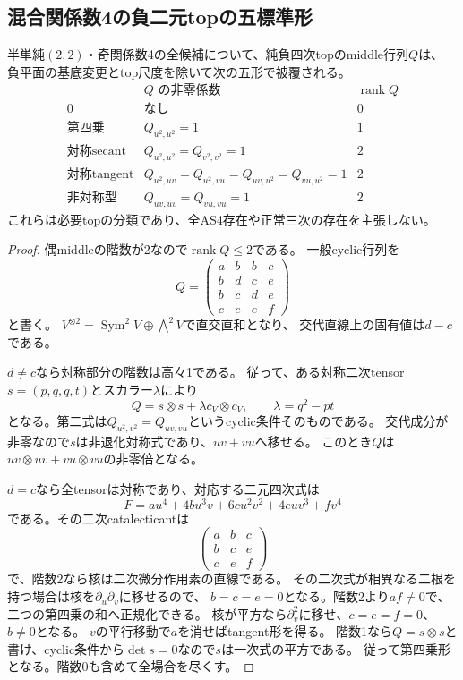 \subsection{混合関係数4の負二元topの五標準形}
\label{subsec:h3-order2-22-rank4-negative-top}
\begin{proposition}\label{prop:h3-order2-22-rank4-negative-top}
半単純$(2,2)$・奇関係数4の全候補について、純負四次topのmiddle行列$Q$は、
負平面の基底変更とtop尺度を除いて次の五形で被覆される。
\[
\begin{array}{c|c|c}
 &Q\text{ の非零係数}&\operatorname{rank}Q\\\hline
0&\text{なし}&0\\
\text{第四乗}&Q_{u^2,u^2}=1&1\\
\text{対称secant}&Q_{u^2,u^2}=Q_{v^2,v^2}=1&2\\
\text{対称tangent}&Q_{u^2,uv}=Q_{u^2,vu}=Q_{uv,u^2}=Q_{vu,u^2}=1&2\\
\text{非対称型}&Q_{uv,uv}=Q_{vu,vu}=1&2
\end{array}
\]
これらは必要topの分類であり、全AS4存在や正常三次の存在を主張しない。
\end{proposition}
\begin{proof}
偶middleの階数が2なので$\operatorname{rank}Q\le2$である。
一般cyclic行列を
\[
 Q=\begin{pmatrix}a&b&b&c\\b&d&c&e\\b&c&d&e\\c&e&e&f\end{pmatrix}
\]
と書く。
$V^{\otimes2}=\operatorname{Sym}^2V\oplus\bigwedge^2V$で直交直和となり、
交代直線上の固有値は$d-c$である。

$d\ne c$なら対称部分の階数は高々1である。
従って、ある対称二次tensor$s=(p,q,q,t)$とスカラー$\lambda$により
\[
 Q=s\otimes s+\lambda c_V\otimes c_V,\qquad
 \lambda=q^2-pt
\]
となる。第二式は$Q_{u^2,v^2}=Q_{uv,vu}$というcyclic条件そのものである。
交代成分が非零なので$s$は非退化対称式であり、$uv+vu$へ移せる。
このとき$Q$は$uv\otimes uv+vu\otimes vu$の非零倍となる。

$d=c$なら全tensorは対称であり、対応する二元四次式は
\[
 F=a u^4+4b u^3v+6c u^2v^2+4e uv^3+f v^4
\]
である。その二次catalecticantは
\[
 \begin{pmatrix}a&b&c\\b&c&e\\c&e&f\end{pmatrix}
\]
で、階数2なら核は二次微分作用素の直線である。
その二次式が相異なる二根を持つ場合は核を$\partial_u\partial_v$に移せるので、
$b=c=e=0$となる。階数2より$af\ne0$で、二つの第四乗の和へ正規化できる。
核が平方なら$\partial_v^2$に移せ、$c=e=f=0$、$b\ne0$となる。
$v$の平行移動で$a$を消せばtangent形を得る。
階数1なら$Q=s\otimes s$と書け、cyclic条件から$\det s=0$なので$s$は一次式の平方である。
従って第四乗形となる。階数0も含めて全場合を尽くす。
\end{proof}


